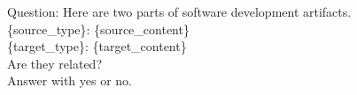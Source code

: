 Question: Here are two parts of software development artifacts.\\
\{source\_type\}: \tripplequote \{source\_content\}\tripplequote\\
\{target\_type\}: \tripplequote\{target\_content\}\tripplequote\\
Are they related?\\
Answer with \textquotesingle{}yes\textquotesingle{} or  \textquotesingle{}no\textquotesingle{}.